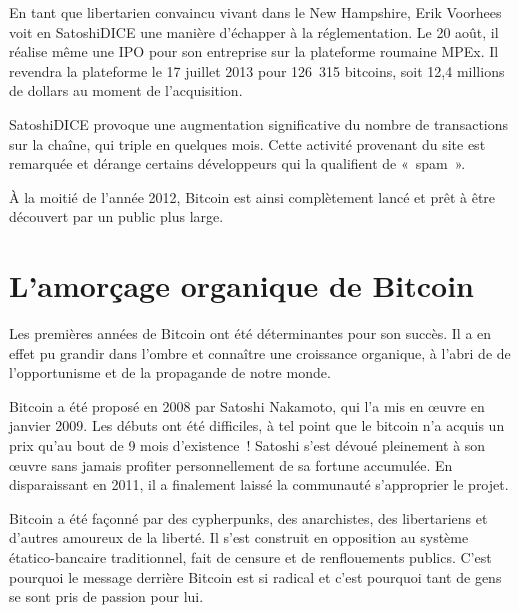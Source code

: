 
En tant que libertarien convaincu vivant dans le New Hampshire, Erik Voorhees voit en SatoshiDICE une manière d'échapper à la réglementation. Le 20 août, il réalise même une IPO pour son entreprise sur la plateforme roumaine MPEx. Il revendra la plateforme le 17 juillet 2013 pour 126~315 bitcoins, soit 12,4 millions de dollars au moment de l'acquisition.

SatoshiDICE provoque une augmentation significative du nombre de transactions sur la chaîne, qui triple en quelques mois. Cette activité provenant du site est remarquée et dérange certains développeurs qui la qualifient de «~spam~».

À la moitié de l'année 2012, Bitcoin est ainsi complètement lancé et prêt à être découvert par un public plus large.

\section*{L'amorçage organique de Bitcoin}

Les premières années de Bitcoin ont été déterminantes pour son succès. Il a en effet pu grandir dans l'ombre et connaître une croissance organique, à l'abri de de l'opportunisme et de la propagande de notre monde.

Bitcoin a été proposé en 2008 par Satoshi Nakamoto, qui l'a mis en œuvre en janvier 2009. Les débuts ont été difficiles, à tel point que le bitcoin n'a acquis un prix qu'au bout de 9 mois d'existence~! Satoshi s'est dévoué pleinement à son œuvre sans jamais profiter personnellement de sa fortune accumulée. En disparaissant en 2011, il a finalement laissé la communauté s'approprier le projet.

Bitcoin a été façonné par des cypherpunks, des anarchistes, des libertariens et d'autres amoureux de la liberté. Il s'est construit en opposition au système étatico-bancaire traditionnel, fait de censure et de renflouements publics. C'est pourquoi le message derrière Bitcoin est si radical et c'est pourquoi tant de gens se sont pris de passion pour lui.

